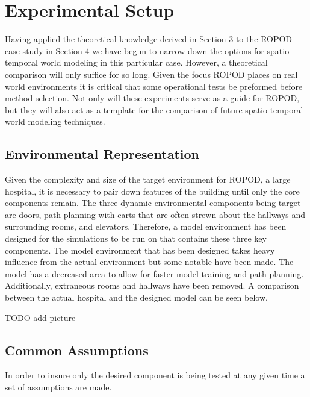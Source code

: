 

  \chapter{Experimental Setup}

  Having applied the theoretical knowledge derived in Section 3 to the ROPOD case
  study in Section 4 we have begun to narrow down the options for spatio-temporal
  world modeling in this particular case. However, a theoretical comparison will
  only suffice for so long. Given the focus ROPOD places on real world
  environments it is critical that some operational tests be preformed before
  method selection. Not only will these experiments serve as a guide for ROPOD,
  but they will also act as a template for the comparison of future
  spatio-temporal world modeling techniques. \\

  \section{ Environmental Representation}

  Given the complexity and size of the target environment for ROPOD, a large
  hospital, it is necessary to pair down features of the building until only
  the core components remain. The three dynamic environmental components being
  target are doors, path planning with carts that are often strewn about the
  hallways and surrounding rooms, and elevators. Therefore, a model
  environment has been designed for the simulations to be run on that contains
  these three key components.  The model environment that has been designed
  takes heavy influence from the actual environment but some notable have been
  made. The model has a decreased area to allow for faster model training and
  path planning. Additionally, extraneous rooms and hallways have been
  removed. A comparison between the actual hospital and the designed model can
  be seen below.

  TODO add picture


  \section{ Common Assumptions }
  In order to insure only the desired component is being tested at any given
  time a set of assumptions are made.

